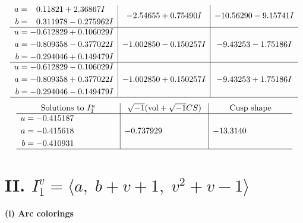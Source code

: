 \documentclass[1p]{elsarticle_modified}
\theoremstyle{definition}
\newcommand{\I}{\sqrt{-1}}
\begin{document}
$$\begin{array}{c|c|c}
\begin{aligned}
a &= \phantom{-}0.11821 + 2.36867 I \\
b &= \phantom{-}0.311978 - 0.275962 I\end{aligned}
 & -2.54655 + 0.75490 I & -10.56290 - 9.15741 I \\ \hline\begin{aligned}
u &= -0.612829 + 0.106029 I \\
a &= -0.809358 - 0.377022 I \\
b &= -0.294046 + 0.149479 I\end{aligned}
 & -1.002850 - 0.150257 I & -9.43253 - 1.75186 I \\ \hline\begin{aligned}
u &= -0.612829 - 0.106029 I \\
a &= -0.809358 + 0.377022 I \\
b &= -0.294046 - 0.149479 I\end{aligned}
 & -1.002850 + 0.150257 I & -9.43253 + 1.75186 I\\
 \hline 
 \end{array}$$\newpage$$\begin{array}{c|c|c}  
\text{Solutions to }I^u_{1}& \I (\text{vol} + \sqrt{-1}CS) & \text{Cusp shape}\\
 \hline 
\begin{aligned}
u &= -0.415187\phantom{ +0.000000I} \\
a &= -0.415618\phantom{ +0.000000I} \\
b &= -0.410931\phantom{ +0.000000I}\end{aligned}
 & -0.737929\phantom{ +0.000000I} & -13.3140\phantom{ +0.000000I}\\
 \hline 
 \end{array}$$\newpage\newpage\renewcommand{\arraystretch}{1}
\centering \section*{II. $I^v_{1}= \langle a,\;b+v+1,\;v^2+v-1 \rangle$}
\flushleft \textbf{(i) Arc colorings}\\
\end{document}
